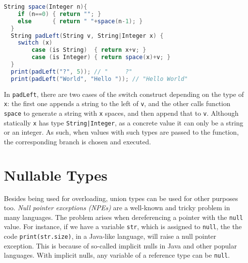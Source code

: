 \begin{lstlisting}[language=Scala]
  String space(Integer n){
    if (n==0) { return ""; }
    else      { return " "+space(n-1); }
  }
  String padLeft(String v, String|Integer x) {
  	switch (x)
    	case (is String)  { return x+v; }
    	case (is Integer) { return space(x)+v; }
  }
  print(padLeft("?", 5)); // "     ?"
  print(padLeft("World", "Hello ")); // "Hello World"
\end{lstlisting}
%

\noindent In \lstinline{padLeft}, there are two cases of the switch construct
depending on the type of \lstinline{x}:
the first
one appends a string to the left of \lstinline{v},
and the other calls function \lstinline{space} to generate a string with \lstinline{x} spaces,
and then append that to \lstinline{v}.
Although statically \lstinline{x} has type \lstinline{String|Integer}, as a concrete value
it can only be a string or an integer.
As such, when values with such types are passed to the function,
the corresponding branch is chosen and executed.







\section{Nullable Types}\label{sec:nullable}
Besides being used for overloading, union types can be used for other purposes too.
\textit{Null pointer exceptions (NPEs)} are a well-known and tricky problem in many languages.
The problem arises when dereferencing a pointer with the \lstinline{null} value.
For instance, if we have a variable \lstinline{str}, which is assigned to \lstinline{null},
the the code \lstinline{print(str.size)}, in a Java-like language, will raise
a null pointer exception.
This is because of so-called implicit nulls in Java and other popular languages.
With implicit nulls, any variable of a reference type can be \lstinline{null}.

